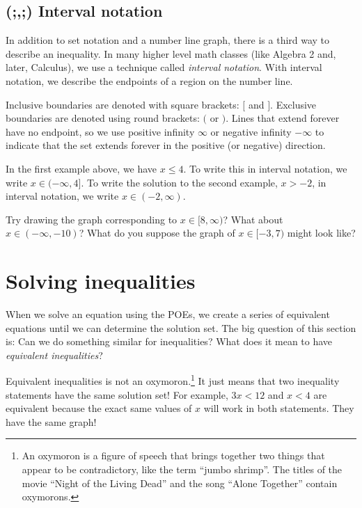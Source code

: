 \subsection{(;,;) Interval notation}

In addition to set notation and a number line graph, there is a third way to describe an inequality. In many higher level math classes (like Algebra 2 and, later, Calculus), we use a technique called \textit{interval notation}. With interval notation, we describe the endpoints of a region on the number line.

Inclusive boundaries are denoted with square brackets: $[$ and $]$.  Exclusive boundaries are denoted using round brackets: $($ or $)$. Lines that extend forever have no endpoint, so we use positive infinity $\infty$ or negative infinity $-\infty$ to indicate that the set extends forever in the positive (or negative) direction.

In the first example above, we have $x \leq 4$. To write this in interval notation, we write $x \in (-\infty, 4]$. To write the solution to the second example, $x>-2$, in interval notation, we write $x \in (-2, \infty)$.

Try drawing the graph corresponding to $x \in [8, \infty)$? What about $x \in (-\infty, -10)$? What do you suppose the graph of $x \in [-3, 7)$ might look like?

\section{Solving inequalities}
\label{sec:ineqsolving}


When we solve an equation using the POEs, we create a series of equivalent equations until we can determine the solution set. The big question of this section is: Can we do something similar for inequalities? What does it mean to have \textit{equivalent inequalities}?

Equivalent inequalities is not an oxymoron.\footnote{An oxymoron is a figure of speech that brings together two things that appear to be contradictory, like the term ``jumbo shrimp''. The titles of the movie ``Night of the Living Dead'' and the song ``Alone Together'' contain oxymorons.} It just means that two inequality statements have the same solution set! For example, $3x < 12$ and $x < 4$ are equivalent because the exact same values of $x$ will work in both statements. They have the same graph!

